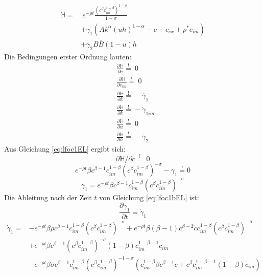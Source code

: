 \begin{equation}
\begin{split}\mathbb{H}=&~e^{-\rho t}\frac{(c^\beta c_{im}^{1-\beta})^{1-\sigma}}{1-\sigma}\\
&+\gamma_1(Ak^\alpha(uh)^{1-\alpha}-c-c_{ex}+p^*c_{im})\\
&+\gamma_2B\bar{B}(1-u)h\end{split}
\end{equation}
Die Bedingungen erster Ordnung lauten:\\
\begin{align}
&\frac{\partial\mathbb{H}}{\partial c}\overset{!}{=}~0\label{eq:lfoc1EL}\\
&\frac{\partial\mathbb{H}}{\partial c_{im}}\overset{!}{=}~0\label{eq:lfoc1imEL}\\
&\frac{\partial\mathbb{H}}{\partial k}\overset{!}{=}-\dot{\gamma_1}\label{eq:lfoc3EL}\\
&\frac{\partial\mathbb{H}}{\partial k}\overset{!}{=}-\dot{\gamma}_{1im}\label{eq:lfoc3imEL}\\
&\frac{\partial\mathbb{H}}{\partial u}\overset{!}{=}~0\label{eq:lfoc4EL}\\
&\frac{\partial\mathbb{H}}{\partial h}\overset{!}{=}-\dot{\gamma_2}\label{eq:lfoc5EL}\end{align}
Aus Gleichung \eqref{eq:lfoc1EL} ergibt sich:\\
\begin{equation*}
\partial\mathbb{H}/\partial c\overset{!}{=}~0
\end{equation*}
\begin{equation}
e^{-\rho t}\beta c^{\beta-1}c_{im}^{1-\beta}(c^\beta c_{im}^{1-\beta})^{-\sigma}-\gamma_1\overset{!}{=}0\label{eq:lfoc1aEL}
\end{equation}
\vspace{-0.7cm}
\begin{equation}
\gamma_1=e^{-\rho t}\beta c^{\beta-1}c_{im}^{1-\beta}(c^\beta c_{im}^{1-\beta})^{-\sigma}\label{eq:lfoc1bEL}
\end{equation}
Die Ableitung nach der Zeit $t$ von Gleichung \eqref{eq:lfoc1bEL} ist:
\begin{equation}\frac{\partial\gamma_1}{\partial t} = \dot{\gamma}_{1}\end{equation}
\begin{equation*}
\begin{split}
		\dot{\gamma}_{1} = &-e^{-\rho t} \beta \rho c^{\beta -1} c_{im}^{1- \beta} (c^{\beta} c_{im}^{1- \beta})^{- \sigma} + e^{-\rho t} \beta (\beta -1 )c^{\beta -2}\dot{c}c_{im}^{1- \beta}(c^{\beta} c_{im}^{1- \beta})^{- \sigma}\\
		& + e^{- \rho t} \beta c^{\beta -1} (c^{\beta} c_{im}^{1- \beta})^{- \sigma}(1- \beta) c_{im}^{1- \beta -1} \dot{c}_{im}\\
		&- e^{- \rho t} \beta \sigma c^{\beta -1} c_{im}^{1- \beta} (c^{\beta} c_{im}^{1- \beta})^{-1- \sigma} (c_{im}^{1- \beta} \beta c^{\beta -1} \dot{c} + c^{\beta} c_{im}^{1- \beta -1}(1- \beta) \dot{c}_{im})
\end{split}
\end{equation*}

